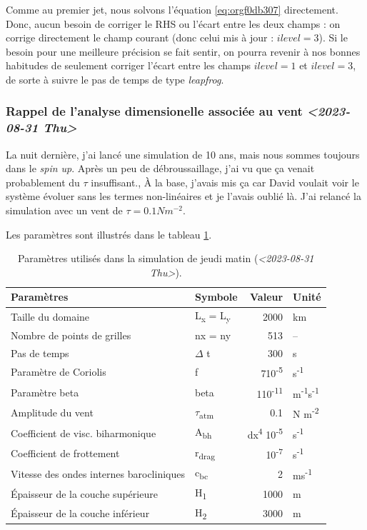 \documentclass[10pt]{article}
\numberwithin{equation}{section}
\begin{document}
Comme au premier jet, nous solvons l'équation \ref{eq:orgf0db307} directement.
Donc, aucun besoin de corriger le RHS ou l'écart entre les deux champs : on corrige directement le champ courant (donc celui mis à jour : \(ilevel=3\)).
Si le besoin pour une meilleure précision se fait sentir, on pourra revenir à nos bonnes habitudes de seulement corriger l'écart entre les champs \(ilevel=1\) et \(ilevel=3\), de sorte à suivre le pas de temps de type \emph{leapfrog}.

\subsubsection{Rappel de l'analyse dimensionelle associée au vent \textit{<2023-08-31 Thu>}}
\label{sec:org0bf2484}
La nuit dernière, j'ai lancé une simulation de 10 ans, mais nous sommes toujours dans le \emph{spin up}.
Après un peu de débroussaillage, j'ai vu que ça venait probablement du \(\tau\) insuffisant.,
À la base, j'avais mis ça car David voulait voir le système évoluer sans les termes non-linéaires et je l'avais oublié là.
J'ai relancé la simulation avec un vent de \(\tau = 0.1 Nm^{-2}\).\bigskip

Les paramètres sont illustrés dans le tableau \ref{tab:org81f8597}.

\begin{table}[htbp]
\caption{\label{tab:org81f8597}Paramètres utilisés dans la simulation de jeudi matin (\textit{<2023-08-31 Thu>}).}
\centering
\begin{tabular}{llrl}
\hline
\hline
Paramètres & Symbole & Valeur & Unité\\[0pt]
\hline
Taille du domaine & L\textsubscript{x} = L\textsubscript{y} & 2000 & km\\[0pt]
Nombre de points de grilles & nx = ny & 513 & --\\[0pt]
Pas de temps & \(\Delta\) t & 300 & s\\[0pt]
Paramètre de Coriolis & f & 7\texttimes{}10\textsuperscript{-5} & s\textsuperscript{-1}\\[0pt]
Paramètre beta & beta & 1\texttimes{}10\textsuperscript{-11} & m\textsuperscript{-1}s\textsuperscript{-1}\\[0pt]
Amplitude du vent & \(\tau\)\textsubscript{atm} & 0.1 & N m\textsuperscript{-2}\\[0pt]
Coefficient de visc. biharmonique & A\textsubscript{bh} & dx\textsuperscript{4} \texttimes{}10\textsuperscript{-5} & s\textsuperscript{-1}\\[0pt]
Coefficient de frottement & r\textsubscript{drag} & 10\textsuperscript{-7} & s\textsuperscript{-1}\\[0pt]
Vitesse des ondes internes barocliniques & c\textsubscript{bc} & 2 & ms\textsuperscript{-1}\\[0pt]
Épaisseur de la couche supérieure & H\textsubscript{1} & 1000 & m\\[0pt]
Épaisseur de la couche inférieur & H\textsubscript{2} & 3000 & m\\[0pt]
\hline
\end{tabular}
\end{table}
\end{document}
